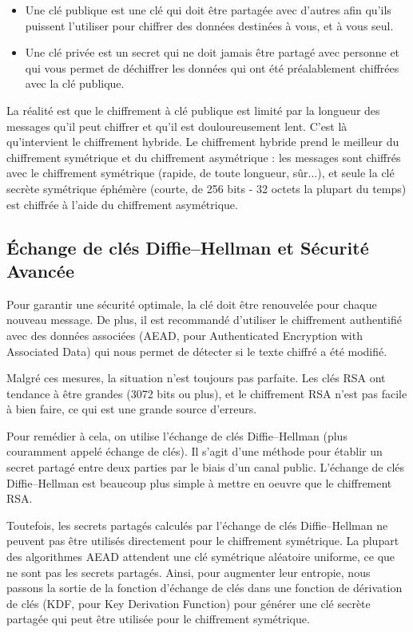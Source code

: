 \begin{itemize}
    \item Une clé publique est une clé qui doit être partagée avec d'autres afin qu'ils puissent l'utiliser pour chiffrer des données destinées à vous, et à vous seul.
    \item Une clé privée est un secret qui ne doit jamais être partagé avec personne et qui vous permet de déchiffrer les données qui ont été préalablement chiffrées avec la clé publique.
\end{itemize}

La réalité est que le chiffrement à clé publique est limité par la longueur des messages qu'il peut chiffrer et qu'il est douloureusement lent. C'est là qu'intervient le chiffrement hybride. Le chiffrement hybride prend le meilleur du chiffrement symétrique et du chiffrement asymétrique : les messages sont chiffrés avec le chiffrement symétrique (rapide, de toute longueur, sûr...), et seule la clé secrète symétrique éphémère (courte, de 256 bits - 32 octets la plupart du temps) est chiffrée à l'aide du chiffrement asymétrique.

\subsection{Échange de clés Diffie–Hellman et Sécurité Avancée}

Pour garantir une sécurité optimale, la clé doit être renouvelée pour chaque nouveau message. De plus, il est recommandé d'utiliser le chiffrement authentifié avec des données associées (AEAD, pour Authenticated Encryption with Associated Data) qui nous permet de détecter si le texte chiffré a été modifié.

Malgré ces mesures, la situation n'est toujours pas parfaite. Les clés RSA ont tendance à être grandes (3072 bits ou plus), et le chiffrement RSA n'est pas facile à bien faire, ce qui est une grande source d'erreurs.

Pour remédier à cela, on utilise l'échange de clés Diffie–Hellman (plus couramment appelé échange de clés). Il s'agit d'une méthode pour établir un secret partagé entre deux parties par le biais d'un canal public. L'échange de clés Diffie–Hellman est beaucoup plus simple à mettre en oeuvre que le chiffrement RSA.

Toutefois, les secrets partagés calculés par l'échange de clés Diffie–Hellman ne peuvent pas être utilisés directement pour le chiffrement symétrique. La plupart des algorithmes AEAD attendent une clé symétrique aléatoire uniforme, ce que ne sont pas les secrets partagés. Ainsi, pour augmenter leur entropie, nous passons la sortie de la fonction d'échange de clés dans une fonction de dérivation de clés (KDF, pour Key Derivation Function) pour générer une clé secrète partagée qui peut être utilisée pour le chiffrement symétrique.

